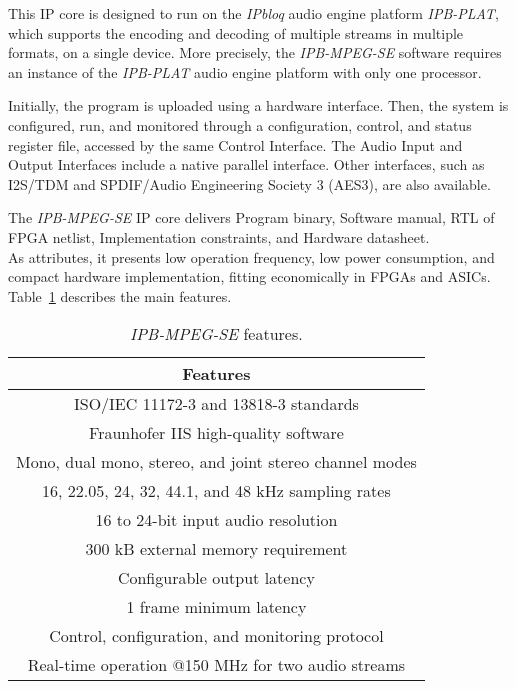 This IP core is designed to run on the \textit{IPbloq} audio engine platform \textit{IPB-PLAT}, which supports the encoding and decoding of multiple streams in multiple formats, on a single device. More precisely, the \textit{IPB-MPEG-SE} software requires an instance of the \textit{IPB-PLAT} audio engine platform with only one processor. 

Initially, the program is uploaded using a hardware interface. Then, the system is configured, run, and monitored through a configuration, control, and status register file, accessed by the same Control Interface.
The Audio Input and Output Interfaces include a native parallel interface. Other interfaces, such as I2S/TDM and SPDIF/Audio Engineering Society 3 (AES3), are also available.

The \textit{IPB-MPEG-SE} IP core delivers Program binary, Software manual, RTL of FPGA netlist, Implementation constraints, and Hardware datasheet.\\
As attributes, it presents low operation frequency, low power consumption, and compact hardware implementation, fitting economically in FPGAs and ASICs.
Table~\ref{tab:ipbloq} describes the main features.

\vspace{0.5cm}

\begin{table}[h]
    \centering
    \begin{tabular}{|c|}
        \hline
        \textbf{Features} \\
        \hline
         ISO/IEC 11172-3 and 13818-3 standards\\
         \hline
         Fraunhofer IIS high-quality software \\
         \hline
         Mono, dual mono, stereo, and joint stereo channel modes\\
         \hline
         16, 22.05, 24, 32, 44.1, and 48 kHz sampling rates \\
         \hline
         16 to 24-bit input audio resolution \\
         \hline
         300 kB external memory requirement\\
         \hline
         Configurable output latency \\
         \hline
         1 frame minimum latency\\
         \hline
         Control, configuration, and monitoring protocol\\
         \hline
         Real-time operation @150 MHz for two audio streams\\
         \hline
    \end{tabular}
    \caption{\textit{IPB-MPEG-SE} features.}
    \label{tab:ipbloq}
\end{table}

